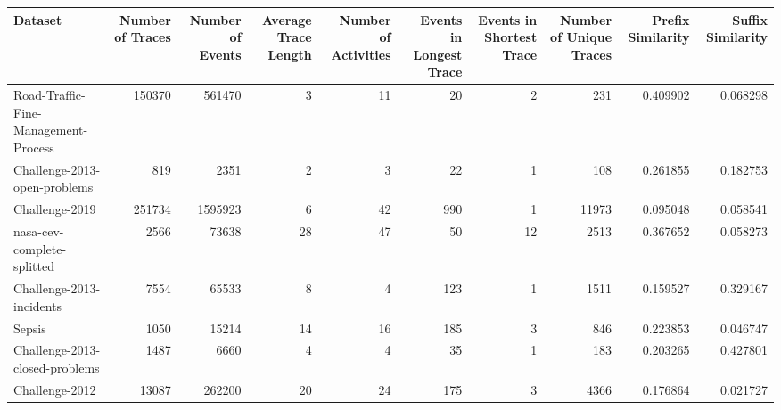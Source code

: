 \begin{tabular}{lrrrrrrrrr}
\toprule
Dataset & Number of Traces & Number of Events & Average Trace Length & Number of Activities & Events in Longest Trace & Events in Shortest Trace & Number of Unique Traces & Prefix Similarity & Suffix Similarity \\
\midrule
Road-Traffic-Fine-Management-Process & 150370 & 561470 & 3 & 11 & 20 & 2 & 231 & 0.409902 & 0.068298 \\
Challenge-2013-open-problems & 819 & 2351 & 2 & 3 & 22 & 1 & 108 & 0.261855 & 0.182753 \\
Challenge-2019 & 251734 & 1595923 & 6 & 42 & 990 & 1 & 11973 & 0.095048 & 0.058541 \\
nasa-cev-complete-splitted & 2566 & 73638 & 28 & 47 & 50 & 12 & 2513 & 0.367652 & 0.058273 \\
Challenge-2013-incidents & 7554 & 65533 & 8 & 4 & 123 & 1 & 1511 & 0.159527 & 0.329167 \\
Sepsis & 1050 & 15214 & 14 & 16 & 185 & 3 & 846 & 0.223853 & 0.046747 \\
Challenge-2013-closed-problems & 1487 & 6660 & 4 & 4 & 35 & 1 & 183 & 0.203265 & 0.427801 \\
Challenge-2012 & 13087 & 262200 & 20 & 24 & 175 & 3 & 4366 & 0.176864 & 0.021727 \\
\bottomrule
\end{tabular}
